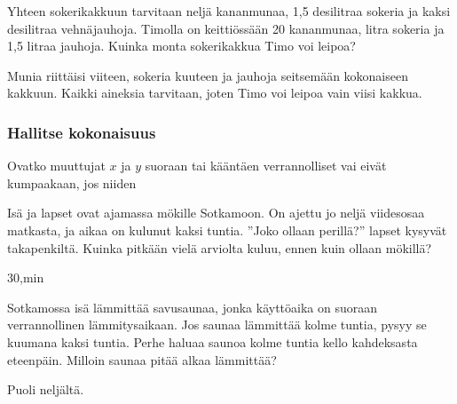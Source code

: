 \begin{tehtavasivu}
\begin{tehtava}
Yhteen sokerikakkuun tarvitaan neljä kananmunaa, 1,5 desilitraa sokeria ja kaksi desilitraa vehnäjauhoja. Timolla on keittiössään 20 kananmunaa, litra sokeria ja 1,5 litraa jauhoja. Kuinka monta sokerikakkua Timo voi leipoa?  
\begin{vastaus}
Munia riittäisi viiteen, sokeria kuuteen ja jauhoja seitsemään kokonaiseen kakkuun. Kaikki aineksia tarvitaan, joten Timo voi leipoa vain viisi kakkua.
\end{vastaus}
\end{tehtava}

\subsubsection*{Hallitse kokonaisuus}

\begin{tehtava}
Ovatko muuttujat $ x $ ja $ y $ suoraan tai kääntäen verrannolliset vai eivät kumpaakaan, jos niiden
\begin{alakohdat}
\end{alakohdat}
\begin{vastaus}
\begin{alakohdat}
\end{alakohdat}
\end{vastaus}
\end{tehtava}

\begin{tehtava}
Isä ja lapset ovat ajamassa mökille Sotkamoon. On ajettu jo neljä viidesosaa matkasta, ja aikaa on kulunut kaksi tuntia. ''Joko ollaan perillä?'' lapset kysyvät takapenkiltä. Kuinka pitkään vielä arviolta kuluu, ennen kuin ollaan mökillä?
    \begin{vastaus}
        $30$,min
    \end{vastaus}
\end{tehtava}

\begin{tehtava}
Sotkamossa isä lämmittää savusaunaa, jonka käyttöaika on suoraan verrannollinen lämmitysaikaan. Jos saunaa lämmittää kolme tuntia, pysyy se kuumana kaksi tuntia. Perhe haluaa saunoa kolme tuntia kello kahdeksasta eteenpäin. Milloin saunaa pitää alkaa lämmittää?
\begin{vastaus}
Puoli neljältä.
\end{vastaus}
\end{tehtava}


\end{tehtavasivu}
